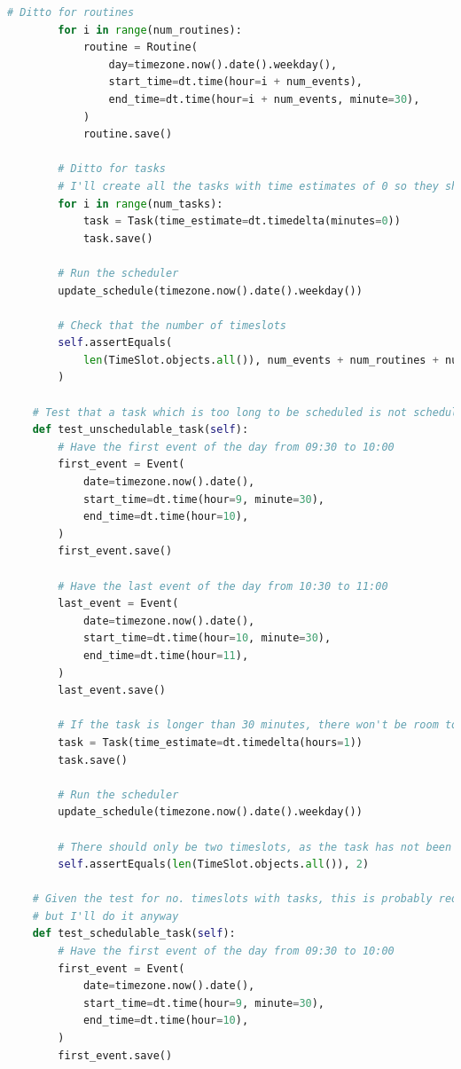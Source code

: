\documentclass{article}
\begin{document}
\begin{lstlisting}[language=Python]
        # Ditto for routines
        for i in range(num_routines):
            routine = Routine(
                day=timezone.now().date().weekday(),
                start_time=dt.time(hour=i + num_events),
                end_time=dt.time(hour=i + num_events, minute=30),
            )
            routine.save()

        # Ditto for tasks
        # I'll create all the tasks with time estimates of 0 so they should definitely be scheduled.
        for i in range(num_tasks):
            task = Task(time_estimate=dt.timedelta(minutes=0))
            task.save()

        # Run the scheduler
        update_schedule(timezone.now().date().weekday())

        # Check that the number of timeslots
        self.assertEquals(
            len(TimeSlot.objects.all()), num_events + num_routines + num_tasks
        )

    # Test that a task which is too long to be scheduled is not scheduled
    def test_unschedulable_task(self):
        # Have the first event of the day from 09:30 to 10:00
        first_event = Event(
            date=timezone.now().date(),
            start_time=dt.time(hour=9, minute=30),
            end_time=dt.time(hour=10),
        )
        first_event.save()

        # Have the last event of the day from 10:30 to 11:00
        last_event = Event(
            date=timezone.now().date(),
            start_time=dt.time(hour=10, minute=30),
            end_time=dt.time(hour=11),
        )
        last_event.save()

        # If the task is longer than 30 minutes, there won't be room to schedule it
        task = Task(time_estimate=dt.timedelta(hours=1))
        task.save()

        # Run the scheduler
        update_schedule(timezone.now().date().weekday())

        # There should only be two timeslots, as the task has not been scheduled
        self.assertEquals(len(TimeSlot.objects.all()), 2)

    # Given the test for no. timeslots with tasks, this is probably redundant,
    # but I'll do it anyway
    def test_schedulable_task(self):
        # Have the first event of the day from 09:30 to 10:00
        first_event = Event(
            date=timezone.now().date(),
            start_time=dt.time(hour=9, minute=30),
            end_time=dt.time(hour=10),
        )
        first_event.save()


\end{lstlisting}
\end{document}
